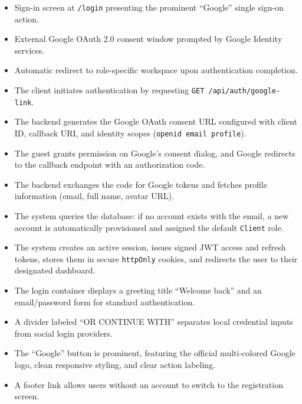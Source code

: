 \begin{itemize}[leftmargin=1.6em,topsep=3pt,itemsep=2pt,parsep=0pt,label=$\bullet$]
    \item Sign-in screen at \texttt{/login} presenting the prominent ``Google'' single sign-on action.
    \item External Google OAuth 2.0 consent window prompted by Google Identity services.
    \item Automatic redirect to role-specific workspace upon authentication completion.
\end{itemize}

\begin{itemize}[leftmargin=1.6em,topsep=3pt,itemsep=2pt,parsep=0pt,label=$\bullet$]
    \item The client initiates authentication by requesting \texttt{GET /api/auth/google-link}.
    \item The backend generates the Google OAuth consent URL configured with client ID, callback URI, and identity scopes (\texttt{openid email profile}).
    \item The guest grants permission on Google's consent dialog, and Google redirects to the callback endpoint with an authorization code.
    \item The backend exchanges the code for Google tokens and fetches profile information (email, full name, avatar URL).
    \item The system queries the database: if no account exists with the email, a new account is automatically provisioned and assigned the default \texttt{Client} role.
    \item The system creates an active session, issues signed JWT access and refresh tokens, stores them in secure \texttt{httpOnly} cookies, and redirects the user to their designated dashboard.
\end{itemize}

\begin{itemize}[leftmargin=1.6em,topsep=3pt,itemsep=2pt,parsep=0pt,label=$\bullet$]
    \item The login container displays a greeting title ``Welcome back'' and an email/password form for standard authentication.
    \item A divider labeled ``OR CONTINUE WITH'' separates local credential inputs from social login providers.
    \item The ``Google'' button is prominent, featuring the official multi-colored Google logo, clean responsive styling, and clear action labeling.
    \item A footer link allows users without an account to switch to the registration screen.
\end{itemize}

